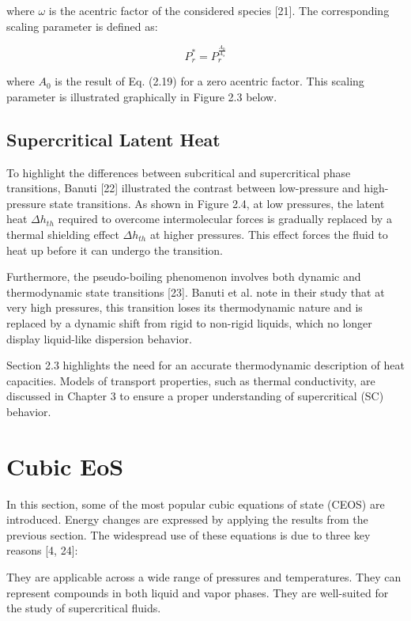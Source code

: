 		where $\omega$ is the acentric factor of the considered species [21]. The
		corresponding scaling parameter is defined as:

		\begin{equation}
			P_r^* = P_r^{\frac{A_0}{A_s}}
		\end{equation}

		where $A_0$ is the result of Eq. (2.19) for a zero acentric factor. This
		scaling parameter is illustrated graphically in Figure 2.3 below.

	\subsection{Supercritical Latent Heat}

	To highlight the differences between subcritical and supercritical phase
	transitions, Banuti [22] illustrated the contrast between low-pressure and
	high-pressure state transitions. As shown in Figure 2.4, at low pressures,
	the latent heat $\Delta h_{th}$ required to overcome intermolecular forces is
	gradually replaced by a thermal shielding effect $\Delta h_{th}$ at higher
	pressures. This effect forces the fluid to heat up before it can undergo the
	transition.

	Furthermore, the pseudo-boiling phenomenon involves both dynamic and
	thermodynamic state transitions [23]. Banuti et al. note in their study that
	at very high pressures, this transition loses its thermodynamic nature and
	is replaced by a dynamic shift from rigid to non-rigid liquids, which no
	longer display liquid-like dispersion behavior.

	Section 2.3 highlights the need for an accurate thermodynamic description of
	heat capacities. Models of transport properties, such as thermal conductivity,
	are discussed in Chapter 3 to ensure a proper understanding of supercritical
	(SC) behavior.

			
\section{Cubic EoS}

In this section, some of the most popular cubic equations of state (CEOS) are
introduced. Energy changes are expressed by applying the results from the
previous section. The widespread use of these equations is due to three key
reasons [4, 24]:

    They are applicable across a wide range of pressures and temperatures. They
    can represent compounds in both liquid and vapor phases. They are
    well-suited for the study of supercritical fluids.

